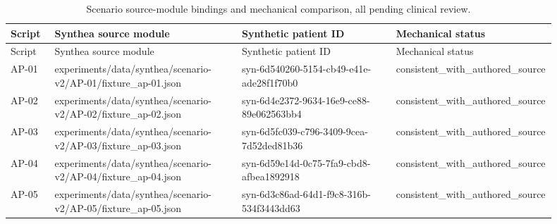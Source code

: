{\small\setlength{\tabcolsep}{3pt}
\begin{longtable}{p{0.08\linewidth}p{0.34\linewidth}p{0.28\linewidth}p{0.2\linewidth}}
\caption{Scenario source-module bindings and mechanical comparison, all pending clinical review.}\label{sup:modulebindings}\\
\hline
Script & Synthea source module & Synthetic patient ID & Mechanical status \\ \hline
\endfirsthead
\hline
Script & Synthea source module & Synthetic patient ID & Mechanical status \\ \hline
\endhead
AP-\allowbreak{}01 & experiments/\allowbreak{}data/\allowbreak{}synthea/\allowbreak{}scenario-\allowbreak{}v2/\allowbreak{}AP-\allowbreak{}01/\allowbreak{}fixture\_\allowbreak{}ap-\allowbreak{}01.\allowbreak{}json & syn-\allowbreak{}6d540260-\allowbreak{}5154-\allowbreak{}cb49-\allowbreak{}e41e-\allowbreak{}ade28f1f70b0 & consistent\_\allowbreak{}with\_\allowbreak{}authored\_\allowbreak{}source \\
AP-\allowbreak{}02 & experiments/\allowbreak{}data/\allowbreak{}synthea/\allowbreak{}scenario-\allowbreak{}v2/\allowbreak{}AP-\allowbreak{}02/\allowbreak{}fixture\_\allowbreak{}ap-\allowbreak{}02.\allowbreak{}json & syn-\allowbreak{}6d4e2372-\allowbreak{}9634-\allowbreak{}16e9-\allowbreak{}ce88-\allowbreak{}89e062563bb4 & consistent\_\allowbreak{}with\_\allowbreak{}authored\_\allowbreak{}source \\
AP-\allowbreak{}03 & experiments/\allowbreak{}data/\allowbreak{}synthea/\allowbreak{}scenario-\allowbreak{}v2/\allowbreak{}AP-\allowbreak{}03/\allowbreak{}fixture\_\allowbreak{}ap-\allowbreak{}03.\allowbreak{}json & syn-\allowbreak{}6d5fc039-\allowbreak{}c796-\allowbreak{}3409-\allowbreak{}9cea-\allowbreak{}7d52ded81b36 & consistent\_\allowbreak{}with\_\allowbreak{}authored\_\allowbreak{}source \\
AP-\allowbreak{}04 & experiments/\allowbreak{}data/\allowbreak{}synthea/\allowbreak{}scenario-\allowbreak{}v2/\allowbreak{}AP-\allowbreak{}04/\allowbreak{}fixture\_\allowbreak{}ap-\allowbreak{}04.\allowbreak{}json & syn-\allowbreak{}6d59e14d-\allowbreak{}0c75-\allowbreak{}7fa9-\allowbreak{}cbd8-\allowbreak{}afbea1892918 & consistent\_\allowbreak{}with\_\allowbreak{}authored\_\allowbreak{}source \\
AP-\allowbreak{}05 & experiments/\allowbreak{}data/\allowbreak{}synthea/\allowbreak{}scenario-\allowbreak{}v2/\allowbreak{}AP-\allowbreak{}05/\allowbreak{}fixture\_\allowbreak{}ap-\allowbreak{}05.\allowbreak{}json & syn-\allowbreak{}6d3c86ad-\allowbreak{}64d1-\allowbreak{}f9c8-\allowbreak{}316b-\allowbreak{}534f3443dd63 & consistent\_\allowbreak{}with\_\allowbreak{}authored\_\allowbreak{}source \\

\end{longtable}}
